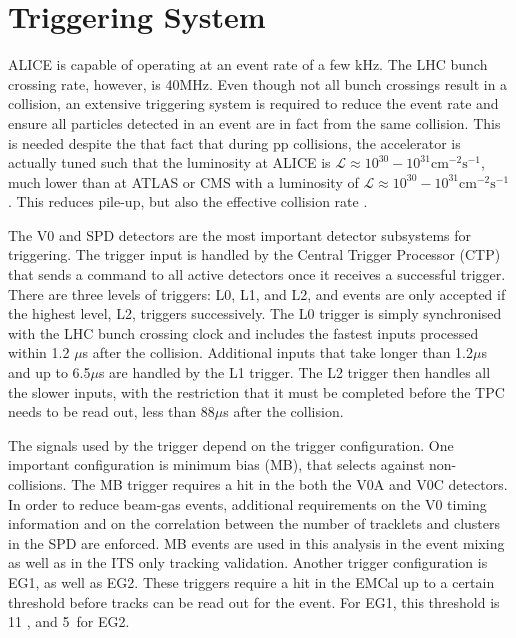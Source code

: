 \section{Triggering System}
\label{sec:trigger}


ALICE is capable of operating at an event rate of a few kHz. The LHC bunch crossing rate, however, is 40MHz. Even though not all bunch crossings result in a collision, an extensive triggering system is required to reduce the event rate and ensure all particles detected in an event are in fact from the same collision. This is needed despite the that fact that during pp collisions, the accelerator is actually tuned such that the luminosity at ALICE is $\mathcal{L}\approx 10^{30}-10^{31}\text{cm}^{-2}\text{s}^{-1}$, much lower than at ATLAS or CMS with a luminosity of $\mathcal{L}\approx 10^{30}-10^{31} \text{cm}^{-2}\text{s}^{-1}$. This reduces pile-up, but also the effective collision rate \cite{Wenninger:2668326}.

 The V0 and SPD detectors are the most important detector subsystems for triggering. The trigger input is handled by the Central Trigger Processor (CTP) that sends a command to all active detectors once it receives a successful trigger. There are three levels of triggers: L0, L1, and L2, and events are only accepted if the highest level, L2, triggers successively. The L0 trigger is simply synchronised with the LHC bunch crossing clock and includes the fastest inputs processed within 1.2 $\mu$s after the collision. Additional inputs that take longer than 1.2$\mu$s and up to 6.5$\mu$s are handled by the L1 trigger. The L2 trigger then handles all the slower inputs, with the restriction that it must be completed before the TPC needs to be read out, less than $88\mu$s after the collision. 

The signals used by the trigger depend on the trigger configuration. One important configuration is minimum bias (MB), that selects against non-collisions. The MB trigger requires a hit in the both the V0A and V0C detectors. In order to reduce beam-gas events, additional requirements on the V0 timing information and on the correlation between the number of tracklets and clusters in the SPD are enforced. MB events are used in this analysis in the event mixing as well as in the ITS only tracking validation. Another trigger configuration is EG1, as well as EG2. These triggers require a hit in the EMCal up to a certain threshold before tracks can be read out for the event. For EG1, this threshold is 11 \GeVc, and 5\GeVc~for EG2. 

